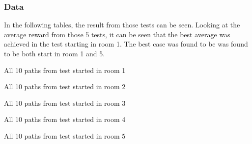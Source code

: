 \documentclass[../Head/Main.tex]{subfiles}
\begin{document}
\subsubsection{Data}
In the following tables, the result from those tests can be seen. Looking at the average reward from those 5 tests, it can be seen that the best average was achieved in the test starting in room 1. The best case was found to be was found to be both start in room 1 and 5.\\
\begin{minipage}[c]{0.49\textwidth}
	\begin{table}[H]
		\centering
		
		\caption{All 10 paths from test started in room 1}
		\vspace{-10pt}
		\label{tab:test_room_1}
	\end{table}
\end{minipage}
\hfill
\begin{minipage}[c]{0.49\textwidth}
	\begin{table}[H]
		\centering
		
		\caption{All 10 paths from test started in room 2}
		\vspace{-10pt}
		\label{tab:test_room_2}
	\end{table}
\end{minipage}

\begin{minipage}[c]{0.49\textwidth}
	\begin{table}[H]
		\centering
		
		\caption{All 10 paths from test started in room 3}
		\label{tab:test_room_3}
	\end{table}
\end{minipage}
\hfill
\begin{minipage}[c]{0.49\textwidth}
	\begin{table}[H]
		\centering
		
		\caption{All 10 paths from test started in room 4}
		\label{tab:test_room_4}
	\end{table}
\end{minipage} 

\begin{table}[H]
	\centering
	
	\caption{All 10 paths from test started in room 5}
	\label{tab:test_room_5}
\end{table}
\end{document}
